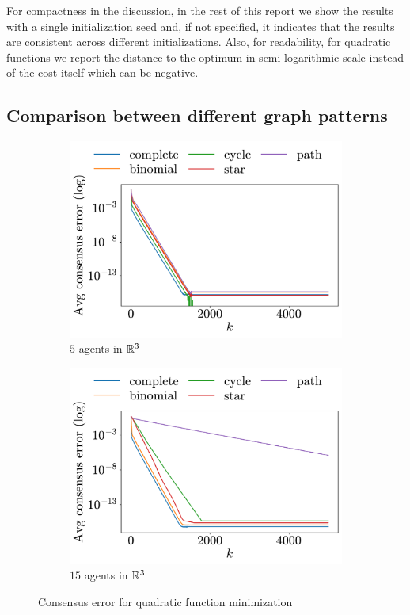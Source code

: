 \documentclass[a4paper,11pt,oneside]{book}
\begin{document}
For compactness in the discussion, in the rest of this report we show the results with a single initialization seed and, if not specified, it indicates that the results are consistent across different initializations. Also, for readability, for quadratic functions we report the distance to the optimum in semi-logarithmic scale instead of the cost itself which can be negative.


\subsection{Comparison between different graph patterns}

\begin{figure}[h!]
      \centering
      \begin{subfigure}[h]{0.43\linewidth}
            \centering
            \includegraphics[width=\linewidth]{./figs/quadratic/5_3/consensus.pdf} 
            \caption{$5$ agents in ${\mathbb{R}}^{3}$}
      \end{subfigure}
      \hfill
      \begin{subfigure}[h]{0.43\linewidth}
            \centering
            \includegraphics[width=\linewidth]{./figs/quadratic/15_3/consensus.pdf} 
            \caption{$15$ agents in ${\mathbb{R}}^{3}$}
      \end{subfigure}
      \caption{Consensus error for quadratic function minimization}
      \label{fig:quadratic_consensus}
\end{figure}
\end{document}
